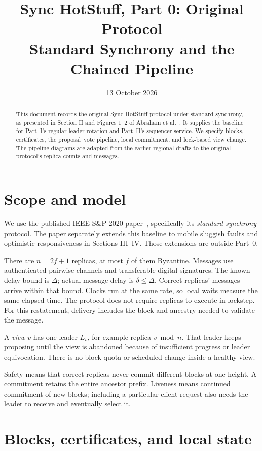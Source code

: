 \documentclass[11pt,a4paper]{article}
\title{Sync HotStuff, Part 0: Original Protocol\\
  \large Standard Synchrony and the Chained Pipeline}
\author{}\date{13 October 2026}
\newcounter{protocol}
\begin{document}
\maketitle
\begin{abstract}
This document records the original Sync HotStuff protocol under standard
synchrony, as presented in Section II and Figures 1--2 of Abraham et
al.~\cite{sync}. It supplies the baseline for Part~I's regular leader
rotation and Part~II's sequencer service. We specify blocks, certificates,
the proposal--vote pipeline, local commitment, and lock-based view change.
The pipeline diagrams are adapted from the earlier regional drafts to
the original protocol's replica counts and messages.
\end{abstract}

\section{Scope and model}
\label{sec:scope}
We use the published IEEE S\&P 2020 paper~\cite{sync}, specifically its
\emph{standard-synchrony} protocol. The paper separately extends this
baseline to mobile sluggish faults and optimistic responsiveness in
Sections III--IV. Those extensions are outside Part~0.

There are $n=2f+1$ replicas, at most $f$ of them Byzantine. Messages use
authenticated pairwise channels and transferable digital signatures.
The known delay bound is $\Delta$; actual message delay is
$\delta\leq\Delta$. Correct replicas' messages arrive within that bound.
Clocks run at the same rate, so local waits measure the same elapsed
time. The protocol does not require replicas to execute in lockstep.
For this restatement, delivery includes the block and ancestry needed
to validate the message.

A \emph{view} $v$ has one leader $L_v$, for example replica $v\bmod n$.
That leader keeps proposing until the view is abandoned because of
insufficient progress or leader equivocation. There is no block quota
or scheduled change inside a healthy view.

Safety means that correct replicas never commit different blocks at one
height. A commitment retains the entire ancestor prefix. Liveness means
continued commitment of new blocks; including a particular client
request also needs the leader to receive and eventually select it.

\section{Blocks, certificates, and local state}
\label{sec:objects}
\end{document}
